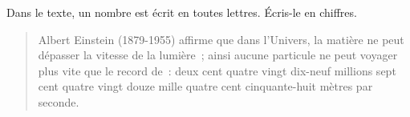 Dans le texte, un nombre est écrit en toutes lettres. \'Ecris-le en
chiffres.
\begin{quote}
Albert Einstein (1879-1955) affirme que dans l'Univers, la matière ne
peut dépasser la vitesse de la lumière ; ainsi aucune particule ne
peut voyager plus vite que le record de : deux cent quatre vingt
dix-neuf millions sept cent quatre vingt douze mille quatre cent
cinquante-huit mètres par seconde.
\end{quote}